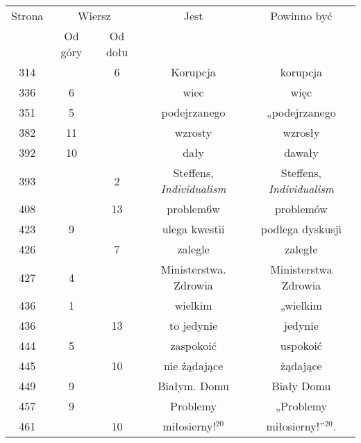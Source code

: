 \documentclass[a4paper,11pt]{article}
\numberwithin{equation}{section}
\begin{document}
\begin{center}
  \newpage

  \begin{tabular}{|c|c|c|c|c|}
    \hline
    Strona & \multicolumn{2}{c|}{Wiersz} & Jest
                              & Powinno być \\ \cline{2-3}
    & Od góry & Od dołu & & \\
    \hline
    314 & &  6 & Korupcja & korupcja \\
    336 &  6 & & wiec & więc \\
    351 &  5 & & podejrzanego & „podejrzanego \\
    382 & 11 & & wzrosty & wzrosły \\
    392 & 10 & & dały & dawały \\
    393 & &  2 & Steffens,{ }{ }\textit{Individualism}
           & Steffens, \textit{Individualism} \\
    408 & & 13 & problem6w & problemów \\
    423 &  9 & & ulega kwestii & podlega dyskusji \\
    426 & &  7 & zalegle & zaległe \\
    427 &  4 & & Ministerstwa. Zdrowia & Ministerstwa Zdrowia \\
    436 &  1 & & wielkim & „wielkim \\
    436 & & 13 & to jedynie & jedynie \\
    444 &  5 & & zaspokoić & uspokoić \\
    445 & & 10 & nie żądające & żądające \\
    449 &  9 & & Białym. Domu & Biały Domu \\
    457 &  9 & & Problemy & „Problemy \\
    461 & & 10 & miłosierny!$^{ 20 }$ & miłosierny!”$^{ 20 }$. \\
    \hline
  \end{tabular}






\end{center}
\end{document}
